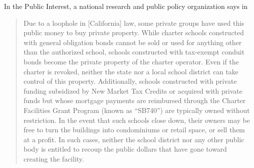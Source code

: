 In the Public Interest, a national research and public policy organization says in \textcite{ITPI2018}
\begin{quotation}
  Due to a loophole in [California] law, some private groups have used this public money to buy private property. While charter schools constructed with general obligation bonds cannot be sold or used for anything other than the authorized school, schools constructed with tax-exempt conduit bonds become the private property of the charter operator. Even if the charter is revoked, neither the state nor a local school district can take control of this property. Additionally, schools constructed with private funding subsidized by New Market Tax Credits or acquired with private funds but whose mortgage payments are reimbursed through the Charter Facilities Grant Program (known as “SB740”) are typically owned without restriction. In the event that such schools close down, their owners may be free to turn the buildings into condominiums or retail space, or sell them at a profit. In such cases, neither the school district nor any other public body is entitled to recoup the public dollars that have gone toward creating the facility.                                                                   
\end{quotation}

